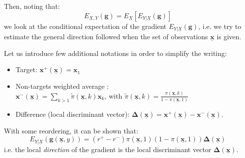 \documentclass[conference]{IEEEtran}
\begin{document}
Then, noting that:
$$E_{\underline{X},Y}(\boldsymbol{g}) = E_{\underline{X}}\left[E_{Y|\underline{X}}(\boldsymbol{g})\right]$$
we look at the conditional expectation of the gradient
$E_{Y|\underline{X}}(\boldsymbol{g})$,
i.e. we try to estimate the general direction followed when
the set of observations $\underline{\mathbf{x}}$ is given.

Let us introduce few additional notations in order to simplify the writing:
\begin{itemize}
 \item Target: 
    $\boldsymbol{x}^+(\underline{\mathbf{x}}) = \boldsymbol{x}_1 $
 \item Non-targets weighted average : 
    $\boldsymbol{x}^-(\underline{\mathbf{x}}) = \sum_{k>1} \tilde{\pi}(\underline{\mathbf{x}},k) \boldsymbol{x}_k
    \mbox{, with } 
    \tilde{\pi}(\underline{\mathbf{x}},k)=\frac{\pi(\underline{\mathbf{x}},k)}{1 - \pi(\underline{\mathbf{x}},1)}$
 \item Difference (local discriminant vector):
    $\boldsymbol{\Delta}(\underline{\mathbf{x}}) = \boldsymbol{x}^+(\underline{\mathbf{x}}) - \boldsymbol{x}^-(\underline{\mathbf{x}})$. 
\end{itemize}

With some reordering, it can be shown that: %
\begin{equation}\label{eq:exp_up}
E_{Y|\underline{X}}(\boldsymbol{g}(\underline{\mathbf{x}},y)) = (r^+-r^-) \pi(\underline{\mathbf{x}},1) (1 - \pi(\underline{\mathbf{x}},1)) \boldsymbol{\Delta}(\underline{\mathbf{x}})
\end{equation}
i.e. the local \emph{direction} of the gradient 
is the local discriminant vector $\boldsymbol{\Delta}(\underline{\mathbf{x}})$. 
\end{document}
